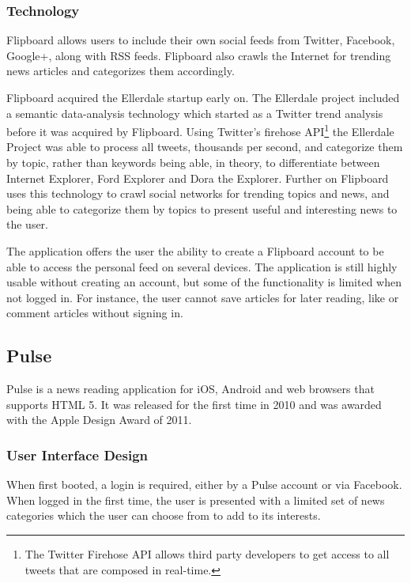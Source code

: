 \subsubsection{Technology}
Flipboard allows users to include their own social feeds from Twitter, Facebook, Google+, along with RSS feeds. Flipboard also crawls the Internet for trending news articles and categorizes them accordingly.

Flipboard acquired the Ellerdale startup early on\cite{flipboard_acquired_ellerdale}. The Ellerdale project included a semantic data-analysis technology which started as a Twitter trend analysis before it was acquired by Flipboard. Using Twitter's firehose API\footnote{The Twitter Firehose API allows third party developers to get access to all tweets that are composed in real-time.} the Ellerdale Project was able to process all tweets, thousands per second, and categorize them by topic, rather than keywords\cite{flipboard_categorize_by_topic} being able, in theory, to differentiate between Internet Explorer, Ford Explorer and Dora the Explorer. Further on Flipboard uses this technology to crawl social networks for trending topics and news, and being able to categorize them by topics to present useful and interesting news to the user.

The application offers the user the ability to create a Flipboard account to be able to access the personal feed on several devices. The application is still highly usable without creating an account, but some of the functionality is limited when not logged in. For instance, the user cannot save articles for later reading, like or comment articles without signing in.

\subsection{Pulse}

Pulse is a news reading application for iOS, Android and web browsers that supports HTML 5. It was released for the first time in 2010 and was awarded with the Apple Design Award of 2011\cite{pulse_apple_design_award}.

\subsubsection{User Interface Design}

When first booted, a login is required, either by a Pulse account or via Facebook. When logged in the first time, the user is presented with a limited set of news categories which the user can choose from to add to its interests. 

